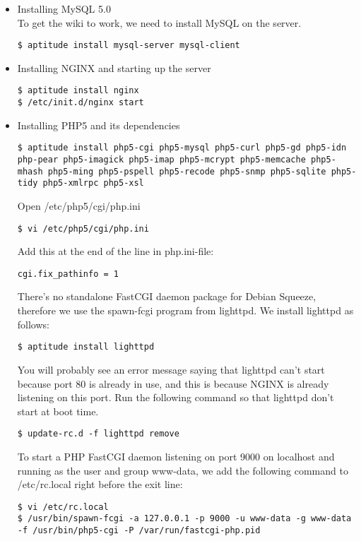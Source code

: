 \begin{itemize}

\item{Installing MySQL 5.0} \\
To get the wiki to work, we need to install MySQL on the server.
\begin{lstlisting}
$ aptitude install mysql-server mysql-client 
\end{lstlisting}

\item{Installing NGINX and starting up the server}
\lstset{language=bash}
\begin{lstlisting}
$ aptitude install nginx
$ /etc/init.d/nginx start
\end{lstlisting}

\item{Installing PHP5 and its dependencies}
\begin{lstlisting}
$ aptitude install php5-cgi php5-mysql php5-curl php5-gd php5-idn php-pear php5-imagick php5-imap php5-mcrypt php5-memcache php5-mhash php5-ming php5-pspell php5-recode php5-snmp php5-sqlite php5-tidy php5-xmlrpc php5-xsl
\end{lstlisting}
Open /etc/php5/cgi/php.ini
\begin{lstlisting}
$ vi /etc/php5/cgi/php.ini
\end{lstlisting}
Add this at the end of the line in php.ini-file:
\begin{lstlisting}
cgi.fix_pathinfo = 1
\end{lstlisting}
There's no standalone FastCGI daemon package for Debian Squeeze, therefore we use the spawn-fcgi program from lighttpd. We install lighttpd as follows: 
\begin{lstlisting}
$ aptitude install lighttpd
\end{lstlisting}
You will probably see an error message saying that lighttpd can't start because port 80 is already in use, and this is because NGINX is already listening on this port. Run the following command so that lighttpd don't start at boot time.
\begin{lstlisting}
$ update-rc.d -f lighttpd remove
\end{lstlisting}
To start a PHP FastCGI daemon listening on port 9000 on localhost and running as the user and group www-data, we add the following command to /etc/rc.local right before the exit line:
\begin{lstlisting}
$ vi /etc/rc.local
$ /usr/bin/spawn-fcgi -a 127.0.0.1 -p 9000 -u www-data -g www-data -f /usr/bin/php5-cgi -P /var/run/fastcgi-php.pid
\end{lstlisting}


\end{itemize}

